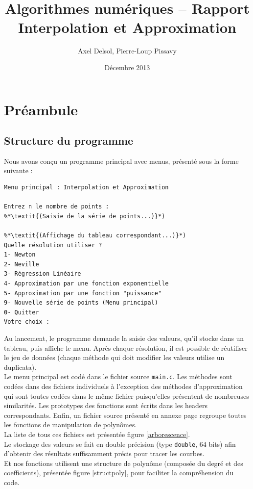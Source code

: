 \documentclass{report}
\title{Algorithmes numériques -- Rapport \\ \vspace{0.5cm}Interpolation et Approximation}
\author{Axel Delsol, Pierre-Loup Pissavy}
\date{Décembre 2013}
\begin{document}
  \maketitle
  \tableofcontents

  \chapter{Préambule}
    \section{Structure du programme}
      Nous avons conçu un programme principal avec menus, présenté sous la forme suivante :
      \begin{lstlisting}[style=apercu, name=Menu Principal]
Menu principal : Interpolation et Approximation

Entrez n le nombre de points : 
%*\textit{(Saisie de la série de points...)}*)

%*\textit{(Affichage du tableau correspondant...)}*)
Quelle résolution utiliser ?
1- Newton
2- Neville
3- Régression Linéaire
4- Approximation par une fonction exponentielle
5- Approximation par une fonction "puissance"
9- Nouvelle série de points (Menu principal)
0- Quitter
Votre choix :
      \end{lstlisting}
      
      Au lancement, le programme demande la saisie des valeurs, qu'il stocke dans un tableau, puis affiche le menu. Après chaque résolution, il est possible de réutiliser le jeu de données (chaque méthode qui doit modifier les valeurs utilise un duplicata). \\
      
      Le menu principal est codé dans le fichier source \verb"main.c". Les méthodes sont codées dans des fichiers individuels à l'exception des méthodes d'approximation qui sont toutes codées dans le même fichier puisqu'elles présentent de nombreuses similarités. Les prototypes des fonctions sont écrits dans les headers correspondants. Enfin, un fichier source présenté en annexe page \pageref{fonctionspolynome} regroupe toutes les fonctions de manipulation de polynômes.\\
      La liste de tous ces fichiers est présentée figure \ref{arborescence}.\\
      
      Le stockage des valeurs se fait en double précision (type \verb"double", 64 bits) afin d'obtenir des résultats suffisamment précis pour tracer les courbes.\\
      Et nos fonctions utilisent une structure de polynôme (composée du degré et des coefficients), présentée figure \ref{structpoly}, pour faciliter la compréhension du code.\\
      
\end{document}
